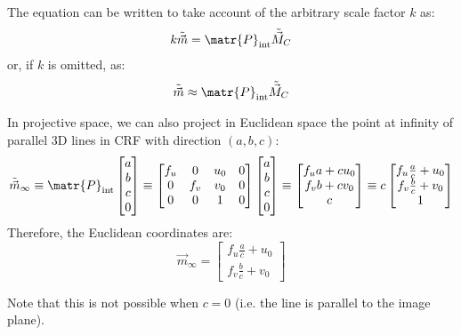 \begin{description}
        \begin{remark}
            The equation can be written to take account of the arbitrary scale factor $k$ as:
            \[ k\tilde{\vec{m}} = \matr{P}_\text{int} \tilde{\vec{M}}_C \]
            or, if $k$ is omitted, as:
            \[ \tilde{\vec{m}} \approx \matr{P}_\text{int} \tilde{\vec{M}}_C \]
        \end{remark}

        \begin{remark}
            In projective space, we can also project in Euclidean space the point at infinity of parallel 3D lines in CRF with direction $(a, b, c)$:
            \[ 
                \tilde{\vec{m}}_\infty \equiv 
                    \matr{P}_\text{int} \begin{bmatrix} a \\ b \\ c \\ 0 \end{bmatrix} \equiv
                    \begin{bmatrix} f_u & 0 & u_0 & 0 \\ 0 & f_v & v_0 & 0 \\ 0 & 0 & 1 & 0 \end{bmatrix} \begin{bmatrix} a \\ b \\ c \\ 0 \end{bmatrix} \equiv
                    \begin{bmatrix} f_u a + c u_0 \\ f_v b + c v_0 \\ c \end{bmatrix} \equiv
                    c\begin{bmatrix} f_u \frac{a}{c} + u_0 \\ f_v \frac{b}{c} + v_0 \\ 1 \end{bmatrix}
            \]
            Therefore, the Euclidean coordinates are:
            \[ \vec{m}_\infty = \begin{bmatrix} f_u \frac{a}{c} + u_0 \\ f_v \frac{b}{c} + v_0 \end{bmatrix} \]
            
            Note that this is not possible when $c = 0$ (i.e. the line is parallel to the image plane).
        \end{remark}


\end{description}
